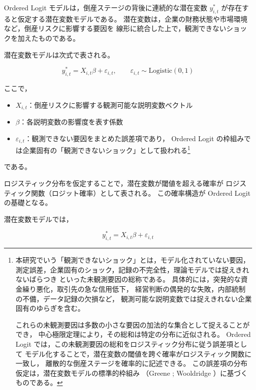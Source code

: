 Ordered Logit モデルは，倒産ステージの背後に連続的な潜在変数
$y^*_{i,t}$ が存在すると仮定する潜在変数モデルである。
潜在変数は，企業の財務状態や市場環境など，倒産リスクに影響する要因を
線形に統合した上で，観測できないショックを加えたものである。

潜在変数モデルは次式で表される。



\[
y^*_{i,t}
=
X_{i,t}\beta + \varepsilon_{i,t},
\qquad
\varepsilon_{i,t} \sim \text{Logistic}(0,1)
\]



ここで，

\begin{itemize}
    \item $X_{i,t}$：倒産リスクに影響する観測可能な説明変数ベクトル  
    \item $\beta$：各説明変数の影響度を表す係数  
    \item $\varepsilon_{i,t}$：観測できない要因をまとめた誤差項であり，
      Ordered Logit の枠組みでは企業固有の「観測できないショック」として扱われる\footnote{
      本研究でいう「観測できないショック」とは，モデル化されていない要因，
      測定誤差，企業固有のショック，記録の不完全性，理論モデルでは捉えきれないばらつき
      といった未観測要因の総称である。
      具体的には，突発的な資金繰り悪化，取引先の急な信用低下，
      経営判断の偶発的な失敗，内部統制の不備，データ記録の欠損など，
      観測可能な説明変数では捉えきれない企業固有のゆらぎを含む。

      これらの未観測要因は多数の小さな要因の加法的な集合として捉えることができ，
      中心極限定理により，その総和は特定の分布に近似される。
      Ordered Logit では，この未観測要因の総和をロジスティック分布に従う誤差項として
      モデル化することで，潜在変数の閾値を跨ぐ確率がロジスティック関数に一致し，
      離散的な倒産ステージを確率的に記述できる。
      この誤差項の分布仮定は，潜在変数モデルの標準的枠組み
      （Greene \parencite{Greene2018}; Wooldridge \parencite{Wooldridge2010}）に基づくものである。
      }
\end{itemize}


である。

ロジスティック分布を仮定することで，潜在変数が閾値を超える確率が
ロジスティック関数（ロジット確率）として表される。
この確率構造が Ordered Logit の基礎となる。

潜在変数モデルでは，



\[
y^*_{i,t} = X_{i,t}\beta + \varepsilon_{i,t}
\]



